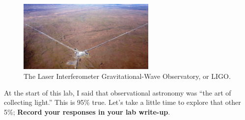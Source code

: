 \documentclass[11pt]{article}
\begin{document}
\begin{figure}
    \centering
    \includegraphics[width=0.6\textwidth]{ligo.jpg}
    \caption{The Laser Interferometer Gravitational-Wave Observatory, or LIGO.}
    \label{fig:ligo}
\end{figure}

At the start of this lab, I said that observational astronomy was ``the art of collecting light.'' This is 95\% true. Let's take a little time to explore that other 5\%; \textbf{Record your responses in your lab write-up}. 
\end{document}
